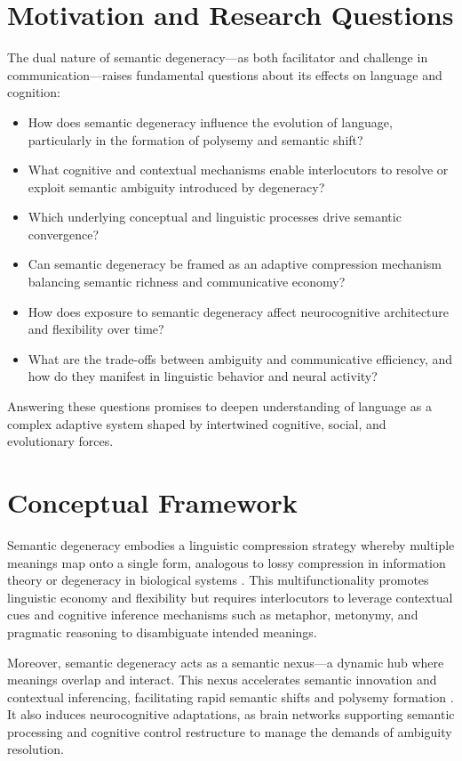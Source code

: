 \documentclass[12pt,a4paper]{article}
\begin{document}
\section{Motivation and Research Questions}

The dual nature of semantic degeneracy—as both facilitator and challenge in communication—raises fundamental questions about its effects on language and cognition:

\begin{itemize}
    \item How does semantic degeneracy influence the evolution of language, particularly in the formation of polysemy and semantic shift?
    \item What cognitive and contextual mechanisms enable interlocutors to resolve or exploit semantic ambiguity introduced by degeneracy?
    \item Which underlying conceptual and linguistic processes drive semantic convergence?
    \item Can semantic degeneracy be framed as an adaptive compression mechanism balancing semantic richness and communicative economy?
    \item How does exposure to semantic degeneracy affect neurocognitive architecture and flexibility over time?
    \item What are the trade-offs between ambiguity and communicative efficiency, and how do they manifest in linguistic behavior and neural activity?
\end{itemize}

Answering these questions promises to deepen understanding of language as a complex adaptive system shaped by intertwined cognitive, social, and evolutionary forces.

\section{Conceptual Framework}

Semantic degeneracy embodies a linguistic compression strategy whereby multiple meanings map onto a single form, analogous to lossy compression in information theory or degeneracy in biological systems \cite{citation_needed}. This multifunctionality promotes linguistic economy and flexibility but requires interlocutors to leverage contextual cues and cognitive inference mechanisms such as metaphor, metonymy, and pragmatic reasoning to disambiguate intended meanings.

Moreover, semantic degeneracy acts as a semantic nexus—a dynamic hub where meanings overlap and interact. This nexus accelerates semantic innovation and contextual inferencing, facilitating rapid semantic shifts and polysemy formation \cite{citation_needed}. It also induces neurocognitive adaptations, as brain networks supporting semantic processing and cognitive control restructure to manage the demands of ambiguity resolution.
\end{document}
